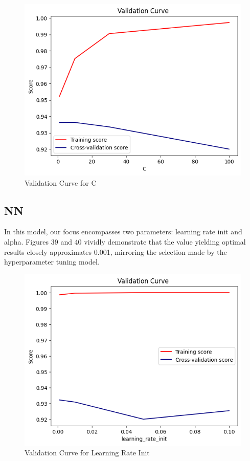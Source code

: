 \documentclass[conference]{IEEEtran}
\begin{document}
\begin{figure}[H]
    \centering
    \includegraphics[width=1\linewidth]{images/ValidationCurveSVCC.png}
    \caption{Validation Curve for C}
    \label{fig:NN-Confusion-AllFeatures}
\end{figure}

\subsection{NN}

In this model, our focus encompasses two parameters: learning rate init and alpha. Figures 39 and 40 vividly demonstrate that the value yielding optimal results closely approximates 0.001, mirroring the selection made by the hyperparameter tuning model.

\begin{figure}[H]
    \centering
    \includegraphics[width=1\linewidth]{images/ValidationCurveNNLearningRateInit.png}
    \caption{Validation Curve for Learning Rate Init}
    \label{fig:NN-Confusion-AllFeatures}
\end{figure}
\end{document}

